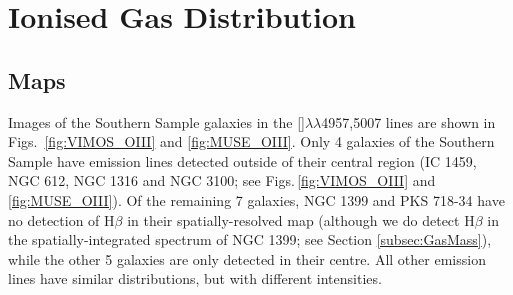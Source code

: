 \section{Ionised Gas Distribution}
	\label{sec:GasFlux}

	\subsection{Maps}
		\label{subsec:GasMaps}
		Images of the Southern Sample galaxies in the []$\lambda\lambda$4957,5007 lines are shown in Figs.\ \ref{fig:VIMOS_OIII} and \ref{fig:MUSE_OIII}. Only 4 galaxies of the Southern Sample have emission lines detected outside of their central region (IC 1459, NGC 612, NGC 1316 and NGC 3100; see Figs.\,\ref{fig:VIMOS_OIII} and \ref{fig:MUSE_OIII}). Of the remaining 7 galaxies, NGC 1399 and PKS 718-34 have no detection of H$\beta$ in their spatially-resolved map (although we do detect H$\beta$ in the spatially-integrated spectrum of NGC 1399; see Section \ref{subsec:GasMass}), while the other 5 galaxies are only detected in their centre. All other emission lines have similar distributions, but with different intensities.%


